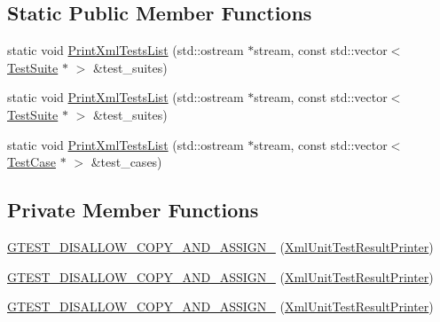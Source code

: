 \subsection*{Static Public Member Functions}
\begin{DoxyCompactItemize}
\item 
static void \mbox{\hyperlink{classtesting_1_1internal_1_1_xml_unit_test_result_printer_a35fba2665c5fb6fa56b8eb5c41fa275e}{Print\+Xml\+Tests\+List}} (std\+::ostream $\ast$stream, const std\+::vector$<$ \mbox{\hyperlink{classtesting_1_1_test_suite}{Test\+Suite}} $\ast$ $>$ \&test\+\_\+suites)
\item 
static void \mbox{\hyperlink{classtesting_1_1internal_1_1_xml_unit_test_result_printer_ac0c61c8cb2820d22a1e84d4ae17e4612}{Print\+Xml\+Tests\+List}} (std\+::ostream $\ast$stream, const std\+::vector$<$ \mbox{\hyperlink{classtesting_1_1_test_suite}{Test\+Suite}} $\ast$ $>$ \&test\+\_\+suites)
\item 
static void \mbox{\hyperlink{classtesting_1_1internal_1_1_xml_unit_test_result_printer_aaefdb155fde088eea18310f23afd2daa}{Print\+Xml\+Tests\+List}} (std\+::ostream $\ast$stream, const std\+::vector$<$ \mbox{\hyperlink{classtesting_1_1_test_case}{Test\+Case}} $\ast$ $>$ \&test\+\_\+cases)
\end{DoxyCompactItemize}
\subsection*{Private Member Functions}
\begin{DoxyCompactItemize}
\item 
\mbox{\hyperlink{classtesting_1_1internal_1_1_xml_unit_test_result_printer_a2384a8c0cae7cbdf3debac145e43b323}{G\+T\+E\+S\+T\+\_\+\+D\+I\+S\+A\+L\+L\+O\+W\+\_\+\+C\+O\+P\+Y\+\_\+\+A\+N\+D\+\_\+\+A\+S\+S\+I\+G\+N\+\_\+}} (\mbox{\hyperlink{classtesting_1_1internal_1_1_xml_unit_test_result_printer}{Xml\+Unit\+Test\+Result\+Printer}})
\item 
\mbox{\hyperlink{classtesting_1_1internal_1_1_xml_unit_test_result_printer_a2384a8c0cae7cbdf3debac145e43b323}{G\+T\+E\+S\+T\+\_\+\+D\+I\+S\+A\+L\+L\+O\+W\+\_\+\+C\+O\+P\+Y\+\_\+\+A\+N\+D\+\_\+\+A\+S\+S\+I\+G\+N\+\_\+}} (\mbox{\hyperlink{classtesting_1_1internal_1_1_xml_unit_test_result_printer}{Xml\+Unit\+Test\+Result\+Printer}})
\item 
\mbox{\hyperlink{classtesting_1_1internal_1_1_xml_unit_test_result_printer_a2384a8c0cae7cbdf3debac145e43b323}{G\+T\+E\+S\+T\+\_\+\+D\+I\+S\+A\+L\+L\+O\+W\+\_\+\+C\+O\+P\+Y\+\_\+\+A\+N\+D\+\_\+\+A\+S\+S\+I\+G\+N\+\_\+}} (\mbox{\hyperlink{classtesting_1_1internal_1_1_xml_unit_test_result_printer}{Xml\+Unit\+Test\+Result\+Printer}})
\end{DoxyCompactItemize}
